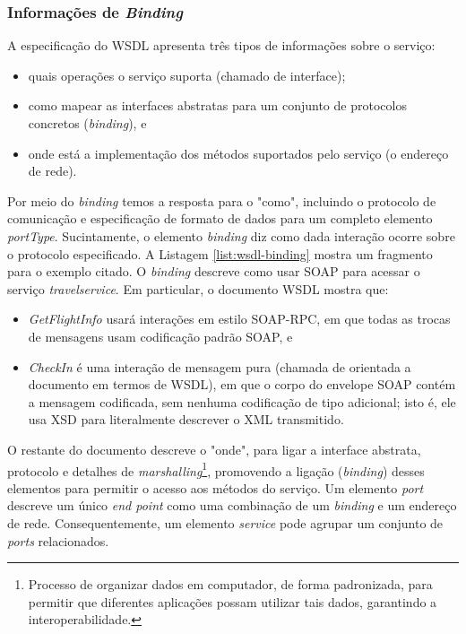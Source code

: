 \subsubsection{Informações de \textit{Binding}}

A especificação do WSDL apresenta três tipos de informações sobre
o serviço\cite{sommerville2011soft}:

\begin{itemize}
	\item quais operações o serviço suporta (chamado de interface);
  \item como mapear as interfaces abstratas para um conjunto de protocolos concretos (\textit{binding}), e
  \item onde está a implementação dos métodos suportados pelo serviço (o endereço de rede).
\end{itemize}


Por meio do \textit{binding} temos a resposta para o "como",
incluindo o protocolo de comunicação e especificação de formato de dados
para um completo elemento \textit{portType}. Sucintamente, o elemento \textit{binding}
diz como dada interação ocorre sobre o protocolo especificado. A Listagem \ref{list:wsdl-binding}
mostra um fragmento para o exemplo citado. O \textit{binding} descreve como usar SOAP
para acessar o serviço \textit{travelservice}. Em particular, o documento WSDL mostra que:

\begin{itemize}
	\item \textit{GetFlightInfo} usará interações em estilo SOAP-RPC,
  em que todas as trocas de mensagens usam codificação padrão SOAP, e
  \item \textit{CheckIn} é uma interação de mensagem pura (chamada de orientada a documento
  em termos de WSDL), em que o corpo do envelope SOAP contém a mensagem codificada,
  sem nenhuma codificação de tipo adicional; isto é, ele usa XSD para literalmente descrever
  o XML transmitido.
\end{itemize}

O restante do documento descreve o "onde", para ligar a interface abstrata, protocolo
e detalhes de \textit{marshalling}\footnote{Processo de organizar dados em computador, de forma padronizada,
para permitir que diferentes aplicações possam utilizar tais dados, garantindo
a interoperabilidade.}, promovendo a ligação (\textit{binding}) desses elementos para permitir
o acesso aos métodos do serviço. Um elemento \textit{port} descreve um único \textit{end point}
como uma combinação de um \textit{binding} e um endereço de rede. Consequentemente, um elemento
\textit{service} pode agrupar um conjunto de \textit{ports} relacionados.

